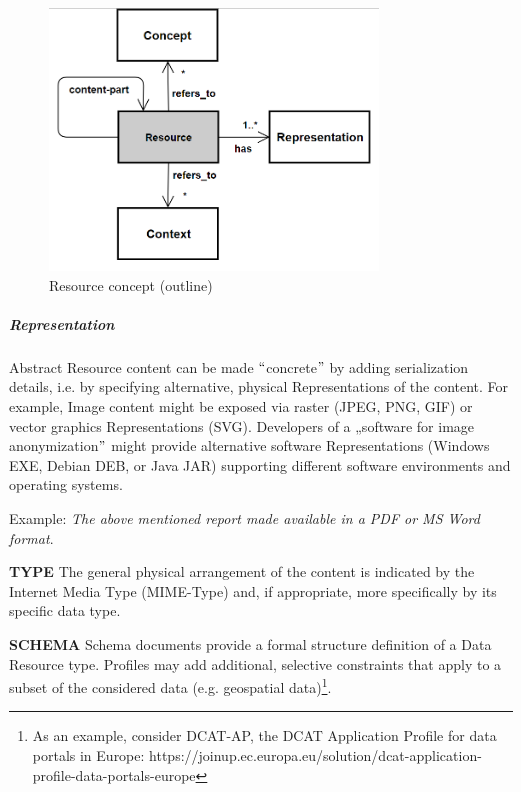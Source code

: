 \begin{figure}[H]
	\begin{Center}
		\includegraphics[width=3.44in,height=2.74in]{./media/image35.png}
		\caption{Resource concept (outline)}
		\label{fig:Resource_concept_outline}
	\end{Center}
\end{figure}




\subparagraph*{Representation}
Abstract Resource content can be made $``$concrete$"$  by adding serialization details, i.e. by specifying alternative, physical Representations of the content. For example, Image content might be exposed via raster (JPEG, PNG, GIF) or vector graphics Representations (SVG). Developers of a „software for image anonymization$"$  might provide alternative software Representations (Windows EXE, Debian DEB, or Java JAR) supporting different software environments and operating systems. 

Example: \textit{The above mentioned report made available in a PDF or MS Word format}. 

\textbf{TYPE} The general physical arrangement of the content is indicated by the Internet Media Type (MIME-Type) and, if appropriate, more specifically by its specific data type.

\textbf{SCHEMA} Schema documents provide a formal structure definition of a Data Resource type. Profiles may add additional, selective constraints that apply to a subset of the considered data (e.g. geospatial data)\footnote{As an example, consider DCAT-AP, the DCAT Application Profile for data portals in Europe: https://joinup.ec.europa.eu/solution/dcat-application-profile-data-portals-europe }.


